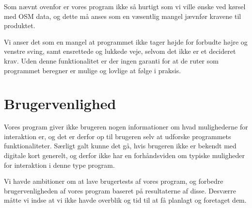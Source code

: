 Som nævnt ovenfor er vores program ikke så hurtigt som vi ville ønske ved kørsel med OSM data, og dette må anses som en væsentlig mangel jævnfør kravene til produktet.

Vi anser det som en mangel at programmet ikke tager højde for forbudte højre og venstre sving, samt ensrettede og lukkede veje, selvom det ikke er et decideret krav. Uden denne funktionalitet er der ingen garanti for at de ruter som programmet beregner er mulige og lovlige at følge i praksis.

\section{Brugervenlighed}
\label{sec:brugervenlighed}

Vores program giver ikke brugeren nogen informationer om hvad mulighederne for interaktion er, og det er derfor op til brugeren selv at udforske programmets funktionaliteter. Særligt galt kunne det gå, hvis brugeren ikke er bekendt med digitale kort generelt, og derfor ikke har en forhåndsviden om typiske muligheder for interaktion i denne type program. 

Vi havde ambitioner om at lave brugertests af vores program, og forbedre brugervenligheden af vores program baseret på resultaterne af disse. Desværre måtte vi indse at vi ikke havde overblik og tid til at få planlagt og foretaget dem.